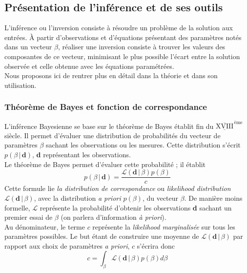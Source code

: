 \documentclass[a4paper,12pt]{article}
\newcommand{\bepar}[1]{
	\left( #1 \right)  
}
\newcommand\bk{\color{black}}
\newcommand\brick{\color{brick}}
\newcommand\dsb{\color{dsb}}
\numberwithin{equation}{section} %
\begin{document}
 
\brick \subsection{Présentation de l'inférence et de ses outils} \bk
\noindent L'inférence ou l'inversion consiste à résoudre un problème de la solution aux entrées. À partir d'observations et d'équations présentant des paramètres notés dans un vecteur $\beta$, réaliser une inversion consiste à trouver les valeurs des composantes de ce vecteur, minimisant le plus possible l'écart entre la solution observée et celle obtenue avec les équations paramétrées. \\
Nous proposons ici de rentrer plus en détail dans la théorie et dans son utilisation.

\dsb \subsubsection{Théorème de Bayes et fonction de correspondance} \bk
\noindent L'inférence Bayesienne se base sur le théorème de Bayes établit fin du $\overline{\underline{\text{XVIII}}}^{\, \text{ème}}$ siècle. Il permet d'évaluer une distribution de probabilités du vecteur de paramètres $\beta$ sachant les observations ou les mesures. Cette distribution s'écrit $p\bepar{\beta\,|\,\textbf{d}}$, \textbf{d} représentant les observations.\\
Le théorème de Bayes permet d'évaluer cette probabilité ; il établit 
\begin{equation}
p\bepar{\beta\,|\,\textbf{d}} = \frac{\mathcal{L}\bepar{\textbf{d}\,|\,\beta}p\bepar{\beta}}{c} %
\end{equation}
Cette formule lie \textit{la distribution de correspondance} ou \textit{likelihood distribution} $\mathcal{L}\bepar{\textbf{d}\,|\,\beta}$, avec la distribution \textit{a priori} $p\bepar{\beta}$, du vecteur $\beta$. De manière moins formelle, $\mathcal{L}$ représente la probabilité d'obtenir les observations \textbf{d} sachant un premier essai de $\beta$ (on parlera d'information \textit{à priori}).\\
Au dénominateur, le terme $c$ représente la \textit{likelihood marginalisée} sur tous les paramètres possibles. Le but étant de construire une moyenne de $\mathcal{L}\bepar{\textbf{d}\,|\,\beta}$ par rapport aux choix de paramètres \textit{a priori}, $c$ s'écrira donc 
\begin{equation}
c = \int_{\beta} \mathcal{L}\bepar{\textbf{d}\,|\,\beta}p\bepar{\beta} d\beta
\end{equation} \\
\end{document}
